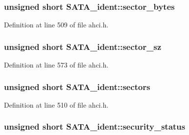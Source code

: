 \subsubsection[{\texorpdfstring{sector\+\_\+bytes}{sector_bytes}}]{\setlength{\rightskip}{0pt plus 5cm}unsigned short S\+A\+T\+A\+\_\+ident\+::sector\+\_\+bytes}\hypertarget{structSATA__ident_a586fe0828c423dac3306683c0b275a35}{}\label{structSATA__ident_a586fe0828c423dac3306683c0b275a35}


Definition at line 509 of file ahci.\+h.

\subsubsection[{\texorpdfstring{sector\+\_\+sz}{sector_sz}}]{\setlength{\rightskip}{0pt plus 5cm}unsigned short S\+A\+T\+A\+\_\+ident\+::sector\+\_\+sz}\hypertarget{structSATA__ident_a36c839a543d3bc8ae5cc834591d0fda2}{}\label{structSATA__ident_a36c839a543d3bc8ae5cc834591d0fda2}


Definition at line 573 of file ahci.\+h.

\subsubsection[{\texorpdfstring{sectors}{sectors}}]{\setlength{\rightskip}{0pt plus 5cm}unsigned short S\+A\+T\+A\+\_\+ident\+::sectors}\hypertarget{structSATA__ident_ad3a035c565a78ea9fafaf696ab2e29b8}{}\label{structSATA__ident_ad3a035c565a78ea9fafaf696ab2e29b8}


Definition at line 510 of file ahci.\+h.

\subsubsection[{\texorpdfstring{security\+\_\+status}{security_status}}]{\setlength{\rightskip}{0pt plus 5cm}unsigned short S\+A\+T\+A\+\_\+ident\+::security\+\_\+status}\hypertarget{structSATA__ident_a103941b9ece90ff1df2c58e2fa2866d7}{}\label{structSATA__ident_a103941b9ece90ff1df2c58e2fa2866d7}


